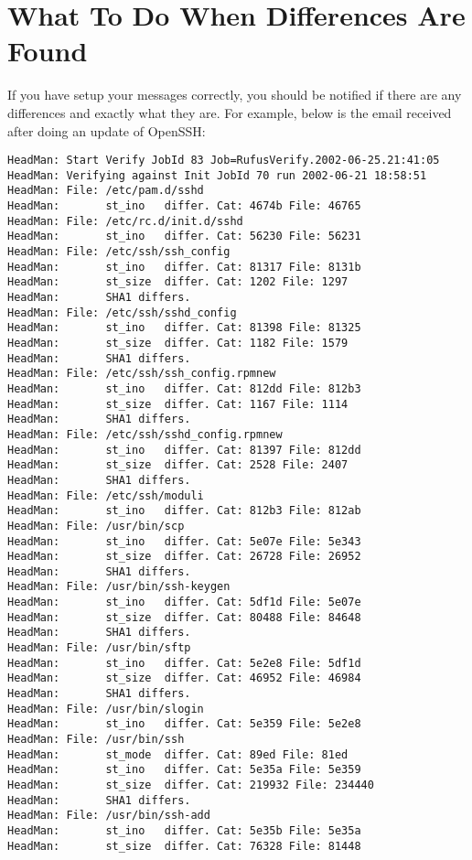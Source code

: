 \section{What To Do When Differences Are Found}

If you have setup your messages correctly, you should be notified if there are
any differences and exactly what they are. For example, below is the email
received after doing an update of OpenSSH:

\footnotesize
\begin{verbatim}
HeadMan: Start Verify JobId 83 Job=RufusVerify.2002-06-25.21:41:05
HeadMan: Verifying against Init JobId 70 run 2002-06-21 18:58:51
HeadMan: File: /etc/pam.d/sshd
HeadMan:       st_ino   differ. Cat: 4674b File: 46765
HeadMan: File: /etc/rc.d/init.d/sshd
HeadMan:       st_ino   differ. Cat: 56230 File: 56231
HeadMan: File: /etc/ssh/ssh_config
HeadMan:       st_ino   differ. Cat: 81317 File: 8131b
HeadMan:       st_size  differ. Cat: 1202 File: 1297
HeadMan:       SHA1 differs.
HeadMan: File: /etc/ssh/sshd_config
HeadMan:       st_ino   differ. Cat: 81398 File: 81325
HeadMan:       st_size  differ. Cat: 1182 File: 1579
HeadMan:       SHA1 differs.
HeadMan: File: /etc/ssh/ssh_config.rpmnew
HeadMan:       st_ino   differ. Cat: 812dd File: 812b3
HeadMan:       st_size  differ. Cat: 1167 File: 1114
HeadMan:       SHA1 differs.
HeadMan: File: /etc/ssh/sshd_config.rpmnew
HeadMan:       st_ino   differ. Cat: 81397 File: 812dd
HeadMan:       st_size  differ. Cat: 2528 File: 2407
HeadMan:       SHA1 differs.
HeadMan: File: /etc/ssh/moduli
HeadMan:       st_ino   differ. Cat: 812b3 File: 812ab
HeadMan: File: /usr/bin/scp
HeadMan:       st_ino   differ. Cat: 5e07e File: 5e343
HeadMan:       st_size  differ. Cat: 26728 File: 26952
HeadMan:       SHA1 differs.
HeadMan: File: /usr/bin/ssh-keygen
HeadMan:       st_ino   differ. Cat: 5df1d File: 5e07e
HeadMan:       st_size  differ. Cat: 80488 File: 84648
HeadMan:       SHA1 differs.
HeadMan: File: /usr/bin/sftp
HeadMan:       st_ino   differ. Cat: 5e2e8 File: 5df1d
HeadMan:       st_size  differ. Cat: 46952 File: 46984
HeadMan:       SHA1 differs.
HeadMan: File: /usr/bin/slogin
HeadMan:       st_ino   differ. Cat: 5e359 File: 5e2e8
HeadMan: File: /usr/bin/ssh
HeadMan:       st_mode  differ. Cat: 89ed File: 81ed
HeadMan:       st_ino   differ. Cat: 5e35a File: 5e359
HeadMan:       st_size  differ. Cat: 219932 File: 234440
HeadMan:       SHA1 differs.
HeadMan: File: /usr/bin/ssh-add
HeadMan:       st_ino   differ. Cat: 5e35b File: 5e35a
HeadMan:       st_size  differ. Cat: 76328 File: 81448

\end{verbatim}
